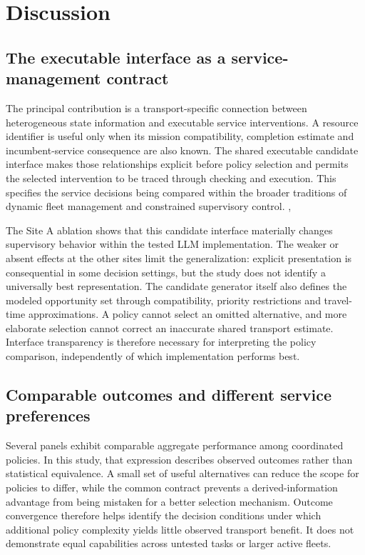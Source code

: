 \documentclass[]{interact}
\theoremstyle{plain}
\theoremstyle{definition}
\theoremstyle{remark}
\begin{document}
\FloatBarrier
\section{Discussion}

\subsection{The executable interface as a service-management contract}

The principal contribution is a transport-specific connection between heterogeneous state information and executable service interventions. A resource identifier is useful only when its mission compatibility, completion estimate and incumbent-service consequence are also known. The shared executable candidate interface makes those relationships explicit before policy selection and permits the selected intervention to be traced through checking and execution. This specifies the service decisions being compared within the broader traditions of dynamic fleet management and constrained supervisory control. \citep{ref4}, \citep{ref8}

The Site A ablation shows that this candidate interface materially changes supervisory behavior within the tested LLM implementation. The weaker or absent effects at the other sites limit the generalization: explicit presentation is consequential in some decision settings, but the study does not identify a universally best representation. The candidate generator itself also defines the modeled opportunity set through compatibility, priority restrictions and travel-time approximations. A policy cannot select an omitted alternative, and more elaborate selection cannot correct an inaccurate shared transport estimate. Interface transparency is therefore necessary for interpreting the policy comparison, independently of which implementation performs best.

\subsection{Comparable outcomes and different service preferences}

Several panels exhibit comparable aggregate performance among coordinated policies. In this study, that expression describes observed outcomes rather than statistical equivalence. A small set of useful alternatives can reduce the scope for policies to differ, while the common contract prevents a derived-information advantage from being mistaken for a better selection mechanism. Outcome convergence therefore helps identify the decision conditions under which additional policy complexity yields little observed transport benefit. It does not demonstrate equal capabilities across untested tasks or larger active fleets.
\end{document}
